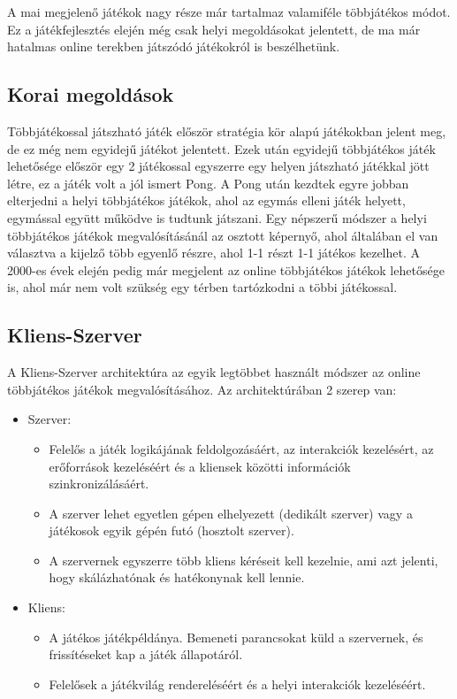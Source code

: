 \documentclass[]{thesis-ekf}
\theoremstyle{definition}
\theoremstyle{remark}
\begin{document}
A mai megjelenő játékok nagy része már tartalmaz valamiféle többjátékos módot. Ez a játékfejlesztés elején még csak helyi megoldásokat jelentett, de ma már hatalmas online terekben játszódó játékokról is beszélhetünk.

\subsection{Korai megoldások}

Többjátékossal játszható játék először stratégia kör alapú játékokban jelent meg, de ez még nem egyidejű játékot jelentett. Ezek után egyidejű többjátékos játék lehetősége először egy 2 játékossal egyszerre egy helyen játszható játékkal jött létre, ez a játék volt a jól ismert Pong. A Pong után kezdtek egyre jobban elterjedni a helyi többjátékos játékok, ahol az egymás elleni játék helyett, egymással együtt működve is tudtunk játszani. Egy népszerű módszer a helyi többjátékos játékok megvalósításánál az osztott képernyő, ahol általában el van választva a kijelző több egyenlő részre, ahol 1-1 részt 1-1 játékos kezelhet. A 2000-es évek elején pedig már megjelent az online többjátékos játékok lehetősége is, ahol már nem volt szükség egy térben tartózkodni a többi játékossal. \cite{MediumMultiplayer}

\subsection{Kliens-Szerver}

A Kliens-Szerver architektúra az egyik legtöbbet használt módszer az online többjátékos játékok megvalósításához. Az architektúrában 2 szerep van:

\begin{itemize}
	\item Szerver:
	\begin{itemize}
		\item Felelős a játék logikájának feldolgozásáért, az interakciók kezelésért, az erőforrások kezeléséért és a kliensek közötti információk szinkronizálásáért.
		\item A szerver lehet egyetlen gépen elhelyezett (dedikált szerver) vagy a játékosok egyik gépén futó (hosztolt szerver).
		\item A szervernek egyszerre több kliens kéréseit kell kezelnie, ami azt jelenti, hogy skálázhatónak és hatékonynak kell lennie.
	\end{itemize}
	\item Kliens:
	\begin{itemize}
		\item A játékos játékpéldánya. Bemeneti parancsokat küld a szervernek, és frissítéseket kap a játék állapotáról.
		\item Felelősek a játékvilág rendereléséért és a helyi interakciók kezeléséért.
	\end{itemize}
\end{itemize}
\end{document}
